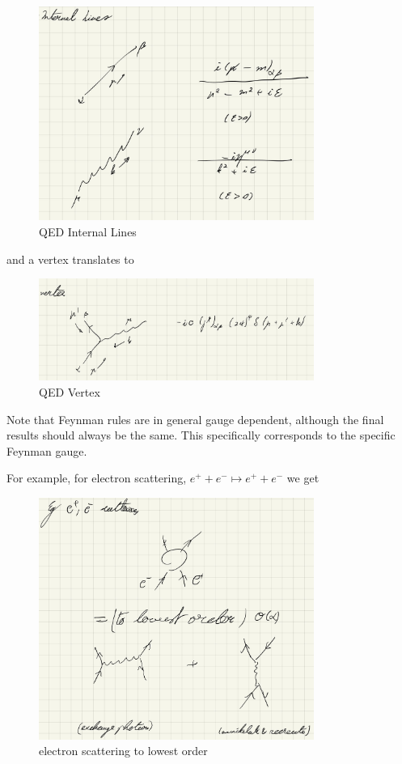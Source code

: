 \documentclass{article}
\theoremstyle{definition}
\begin{document}
\begin{figure}[H]
  \centering
  \includegraphics[width=9cm]{res/QFT/qed_internal_lines}
  \caption{QED Internal Lines}
  \label{qed_internal_lines}
\end{figure}

and a vertex translates to

\begin{figure}[H]
  \centering
  \includegraphics[width=9cm]{res/QFT/qed_vertex}
  \caption{QED Vertex}
  \label{qed_vertex}
\end{figure}

Note that Feynman rules are in general gauge dependent, although the final
results should always be the same. This specifically corresponds to the specific
Feynman gauge.

For example, for electron scattering, $e^+ + e^- \mapsto e^+ + e^-$ we get

\begin{figure}[H]
  \centering
  \includegraphics[width=9cm]{res/QFT/qed_electron_scattering}
  \caption{electron scattering to lowest order}
  \label{qed_electron_scattering}
\end{figure}
\end{document}
